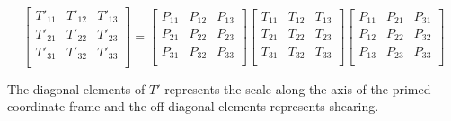 \begin{equation}
  \left[{\begin{matrix} 
        T'_{11} & T'_{12} & T'_{13} \\ 
        T'_{21} & T'_{22} & T'_{23} \\ 
        T'_{31} & T'_{32} & T'_{33} \\ 
      \end{matrix}}\right]
  =
  \left[{\begin{matrix}
        P_{11} & P_{12} & P_{13} \\ 
        P_{21} & P_{22} & P_{23} \\
        P_{31} & P_{32} & P_{33} \\ 
      \end{matrix}}\right]
  \left[{\begin{matrix} 
        T_{11} & T_{12} & T_{13} \\ 
        T_{21} & T_{22} & T_{23} \\ 
        T_{31} & T_{32} & T_{33} \\ 
      \end{matrix}}\right]
  \left[{\begin{matrix} 
        P_{11} & P_{21} & P_{31} \\ 
        P_{12} & P_{22} & P_{32} \\ 
        P_{13} & P_{23} & P_{33} \\ 
      \end{matrix}}\right]
\end{equation}

The diagonal elements of $T'$ represents the scale along the axis of
the primed coordinate frame and the off-diagonal elements represents
shearing.






